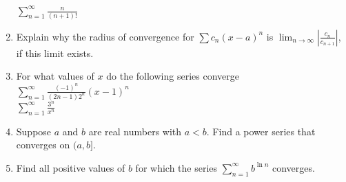 \documentclass[11pt]{article}
\begin{document}
\begin{enumerate}
{    $\sum_{n=1}^{\infty}\frac{n}{(n+1)!}$
  }


  \item{     Explain why the radius of convergence for $\sum c_n(x-a)^n$ is $\lim_{n\to\infty}\left|\frac{c_n}{c_{n+1}} \right|$, if this
  limit exists.}


    \item{For what values of $x$ do the following series converge\\

      $\sum_{n=1}^{\infty}\frac{(-1)^n}{(2n-1)2^n}(x-1)^n$\\
      
      $\sum_{n=1}^{\infty}\frac{3^n}{x^n}$
    }

    \item{ Suppose $a$ and $b$ are real numbers with $a<b$.  Find a power series that converges on $(a,b]$.}
      
      \item{Find all positive values of $b$ for which the series $\sum_{n=1}^{\infty}b^{\ln{n}}$ converges.}
\end{enumerate}
\end{document}
